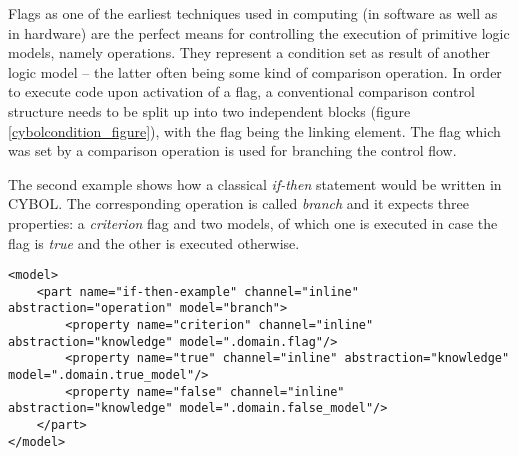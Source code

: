 Flags as one of the earliest techniques used in computing (in software as well
as in hardware) are the perfect means for controlling the execution of
primitive logic models, namely operations. They represent a condition set as
result of another logic model -- the latter often being some kind of comparison
operation. In order to execute code upon activation of a flag, a conventional
comparison control structure needs to be split up into two independent blocks
(figure \ref{cybolcondition_figure}), with the flag being the linking element.
The flag which was set by a comparison operation is used for branching the
control flow.

The second example shows how a classical \emph{if-then} statement would be
written in CYBOL. The corresponding operation is called \emph{branch} and it
expects three properties: a \emph{criterion} flag and two models, of which one
is executed in case the flag is \emph{true} and the other is executed otherwise.

\begin{scriptsize}
    \begin{verbatim}
<model>
    <part name="if-then-example" channel="inline" abstraction="operation" model="branch">
        <property name="criterion" channel="inline" abstraction="knowledge" model=".domain.flag"/>
        <property name="true" channel="inline" abstraction="knowledge" model=".domain.true_model"/>
        <property name="false" channel="inline" abstraction="knowledge" model=".domain.false_model"/>
    </part>
</model>
    \end{verbatim}
\end{scriptsize}
